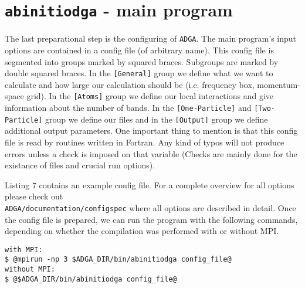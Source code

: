 \documentclass[a4paper,11pt]{article}
\numberwithin{equation}{section} %
\begin{document}
\newpage
\section{\protect\Verb+abinitiodga+ - main program}
The last preparational step is the configuring of \verb+ADGA+. The main program's input options are contained in a config file (of arbitrary name). This config file is segmented into groups marked by squared braces. Subgroups are marked by double squared braces. In the {\color{red} \verb|[General]|} group we define what we want to calculate and how large our calculation should be (i.e. frequency box, momentum-space grid). In the {\color{red} \verb|[Atoms]|} group we define our local interactions and give information about the number of bands. In the {\color{red} \verb|[One-Particle]|} and {\color{red} \verb|[Two-Particle]|} group we define our files and in the {\color{red} \verb|[Output]|} group we define additional output parameters. One important thing to mention is that this config file is read by routines written in Fortran. Any kind of typos will not produce errors unless a check is imposed on that variable (Checks are mainly done for the existance of files and crucial run options).


Listing 7 contains an example config file.
For a complete overview for all options please check out \\
{\color{blue}\verb|ADGA/documentation/configspec|} where all options are described in detail. Once the config file is prepared, we can run the program with the following commands, depending on whether the compilation was performed with or without MPI.

\begin{lstlisting}[caption=abinitiodga run commands, frame=single, basicstyle=\small, style=base]
with MPI:
$ @mpirun -np 3 $ADGA_DIR/bin/abinitiodga config_file@
without MPI:
$ @$ADGA_DIR/bin/abinitiodga config_file@
\end{lstlisting}
\end{document}

